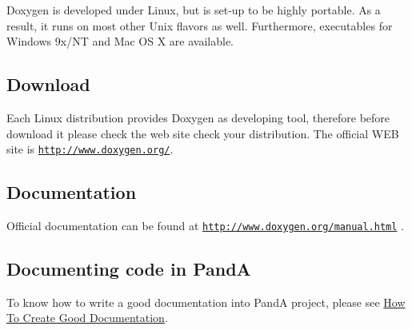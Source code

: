Doxygen is developed under Linux, but is set-\/up to be highly portable. As a result, it runs on most other Unix flavors as well. Furthermore, executables for Windows 9x/\+NT and Mac OS X are available.\hypertarget{panda_sdk_doxygen_download}{}\subsection{Download}\label{panda_sdk_doxygen_download}
Each Linux distribution provides Doxygen as developing tool, therefore before download it please check the web site check your distribution. The official W\+EB site is \href{http://www.doxygen.org/}{\tt http\+://www.\+doxygen.\+org/}.\hypertarget{panda_sdk_doxygen_documentation}{}\subsection{Documentation}\label{panda_sdk_doxygen_documentation}
Official documentation can be found at \href{http://www.doxygen.org/manual.html}{\tt http\+://www.\+doxygen.\+org/manual.\+html} .\hypertarget{panda_sdk_doxygen_panda_doc}{}\subsection{Documenting code in PandA}\label{panda_sdk_doxygen_panda_doc}
To know how to write a good documentation into PandA project, please see \hyperlink{documentation_how_to}{How To Create Good Documentation}. 